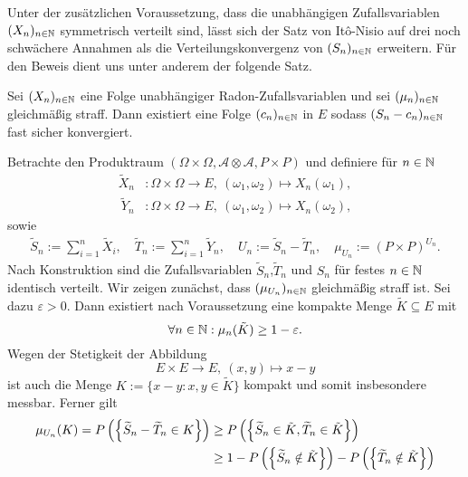 Unter der zusätzlichen Voraussetzung, dass die unabhängigen Zufallsvariablen $(X_n)_{n \in \mathbb{N}}$ symmetrisch verteilt sind, lässt sich der Satz von Itô-Nisio auf drei noch schwächere Annahmen als die Verteilungskonvergenz von $(S_n)_{n \in \mathbb{N}}$ erweitern. 
Für den Beweis dient uns unter anderem der folgende Satz. 
\begin{theorem}
    Sei $(X_n)_{n \in \mathbb{N}}$ eine Folge unabhängiger Radon-Zufallsvariablen und sei $(\mu_n)_{n \in \mathbb{N}}$ gleichmäßig straff. Dann existiert eine Folge $(c_n)_{n \in \mathbb{N}}$ in $E$ sodass $(S_n - c_n)_{n \in \mathbb{N}}$ fast sicher konvergiert.
\end{theorem}

\begin{proof*}
    Betrachte den Produktraum $(\Omega \times \Omega, \mathcal{A} \otimes \mathcal{A}, P \times P)$ und definiere für $n \in \mathbb{N}$
    \begin{align*}
        \widetilde{X}_n&: \Omega \times \Omega \to E, \ (\omega_1, \omega_2) \mapsto X_n(\omega_1), \\\
        \widetilde{Y}_n&: \Omega \times \Omega \to E, \ (\omega_1, \omega_2) \mapsto X_n(\omega_2),
    \end{align*}
    sowie 
    \begin{align*}
        \widetilde{S}_n := \sum_{i = 1}^n \widetilde{X}_i, \quad \widetilde{T}_n := \sum_{i = 1}^n \widetilde{Y}_n, \quad U_n := \widetilde{S}_n - \widetilde{T}_n, \quad \mu_{U_n} := (P\times P)^{U_n}. 
    \end{align*}
    Nach Konstruktion sind die Zufallsvariablen $\widetilde{S}_n$,$\widetilde{T}_n$ und $S_n$ für festes $n \in \mathbb{N}$ identisch verteilt. Wir zeigen zunächst, dass $(\mu_{U_n})_{n \in \mathbb{N}}$ gleichmäßig straff ist. 
    Sei dazu $\varepsilon > 0$. Dann existiert nach Voraussetzung eine kompakte Menge $\tilde{K} \subseteq E$ mit 
    $$
        \forall n \in \mathbb{N}: \mu_n(\tilde{K}) \geq 1 - \varepsilon. 
    $$
    Wegen der Stetigkeit der Abbildung 
    $$
        E \times E \to E, \ (x,y) \mapsto x - y
    $$
    ist auch die Menge $K := \{ x - y : x,y \in \tilde{K}\}$ kompakt und somit insbesondere messbar. Ferner gilt
    \begin{align*}
        \mu_{U_n}(K) = \prob{\widetilde{S}_n - \widetilde{T}_n \in K} &\geq \prob{\widetilde{S}_n \in \tilde{K}, \widetilde{T}_n \in \tilde{K}} \\\
                                                              &\geq 1 - \prob{\widetilde{S}_n \notin \tilde{K}} - \prob{\widetilde{T}_n \notin \tilde{K}} \\\

\end{align*}
\end{proof*}
